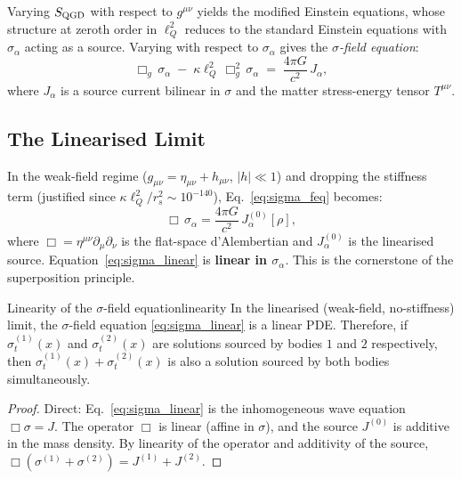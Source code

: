 \documentclass[11pt,a4paper]{article}
\theoremstyle{definition}
\theoremstyle{remark}
\newcommand{\sig}[2]{\sigma_{#1}^{(#2)}}
\newcommand{\lQ}{\ell_{Q}}
\begin{document}
	Varying $S_{\rm QGD}$ with respect to $g^{\mu\nu}$ yields the
	modified Einstein equations, whose structure at zeroth order in $\lQ^2$
	reduces to the standard Einstein equations with $\sigma_\alpha$ acting
	as a source.  Varying with respect to $\sigma_\alpha$ gives the
	\emph{$\sigma$-field equation}:
	\begin{equation}
		\Box_g\,\sigma_\alpha
		\;-\;
		\kappa\lQ^2\,\Box_g^2\,\sigma_\alpha
		\;=\;
		\frac{4\pi G}{c^2}\,J_\alpha,
		\label{eq:sigma_feq}
	\end{equation}
	where $J_\alpha$ is a source current bilinear in $\sigma$ and the
	matter stress-energy tensor $T^{\mu\nu}$.
	
	\subsection{The Linearised Limit}
	
	In the weak-field regime ($g_{\mu\nu}=\eta_{\mu\nu}+h_{\mu\nu}$,
	$|h|\ll1$) and dropping the stiffness term (justified since
	$\kappa\lQ^2/r_s^2\sim10^{-140}$), Eq.~\eqref{eq:sigma_feq} becomes:
	\begin{equation}
		\Box\,\sigma_\alpha = \frac{4\pi G}{c^2}\,J_\alpha^{(0)}[\rho],
		\label{eq:sigma_linear}
	\end{equation}
	where $\Box=\eta^{\mu\nu}\partial_\mu\partial_\nu$ is the flat-space
	d'Alembertian and $J_\alpha^{(0)}$ is the linearised source.
	Equation~\eqref{eq:sigma_linear} is \textbf{linear in $\sigma_\alpha$}.
	This is the cornerstone of the superposition principle.
	
	\begin{proposition}{Linearity of the $\sigma$-field equation}{linearity}
		In the linearised (weak-field, no-stiffness) limit, the $\sigma$-field
		equation \eqref{eq:sigma_linear} is a linear PDE.  Therefore, if
		$\sig{t}{1}(x)$ and $\sig{t}{2}(x)$ are solutions sourced by bodies
		$1$ and $2$ respectively, then $\sig{t}{1}(x)+\sig{t}{2}(x)$ is also
		a solution sourced by both bodies simultaneously.
	\end{proposition}
	
	\begin{proof}
		Direct: Eq.~\eqref{eq:sigma_linear} is the inhomogeneous wave equation
		$\Box\sigma=J$.  The operator $\Box$ is linear (affine in $\sigma$),
		and the source $J^{(0)}$ is additive in the mass density.  By
		linearity of the operator and additivity of the source,
		$\Box(\sigma^{(1)}+\sigma^{(2)})=J^{(1)}+J^{(2)}$.
	\end{proof}
	
\end{document}
